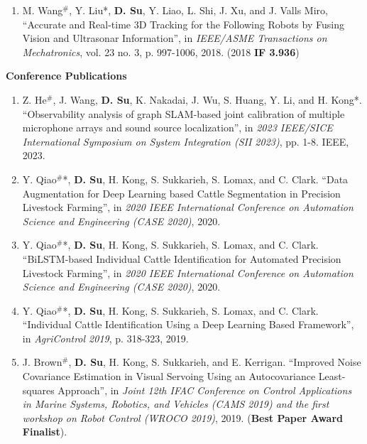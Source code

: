 \documentclass[margin,line]{res}
\begin{document}
\begin{resume}
\begin{enumerate}
\item M. Wang$^{\#}$, Y. Liu*, {\bf D. Su}, Y. Liao, L. Shi, J. Xu, and J. Valls Miro, ``Accurate and Real-time 3D Tracking for the Following Robots by Fusing Vision and Ultrasonar Information'', in {\it IEEE/ASME Transactions on Mechatronics}, vol. 23 no. 3, p. 997-1006, 2018. (2018 \textbf{IF 3.936})
\end{enumerate}

\textbf{Conference Publications}
\begin{enumerate}

\item Z. He$^{\#}$, J. Wang, \textbf{D. Su}, K. Nakadai, J. Wu, S. Huang, Y. Li, and H. Kong*. ``Observability analysis of graph SLAM-based joint calibration of multiple microphone arrays and sound source localization'', in \textit{2023 IEEE/SICE International Symposium on System Integration (SII 2023)}, pp. 1-8. IEEE, 2023.

\item Y. Qiao$^{\#}$*, \textbf{D. Su}, H. Kong, S. Sukkarieh, S. Lomax, and C. Clark. ``Data Augmentation for Deep Learning based Cattle Segmentation in Precision Livestock Farming'', in \textit{2020 IEEE International Conference on Automation Science and Engineering (CASE 2020)}, 2020.

\item Y. Qiao$^{\#}$*, \textbf{D. Su}, H. Kong, S. Sukkarieh, S. Lomax, and C. Clark. ``BiLSTM-based Individual Cattle Identification for Automated Precision Livestock Farming'', in \textit{2020 IEEE International Conference on Automation Science and Engineering (CASE 2020)}, 2020.

\item Y. Qiao$^{\#}$*, \textbf{D. Su}, H. Kong, S. Sukkarieh, S. Lomax, and C. Clark. ``Individual Cattle Identification Using a Deep Learning Based Framework'', in {\it AgriControl 2019}, p. 318-323, 2019.

\item J. Brown$^{\#}$, \textbf{D. Su}, H. Kong, S. Sukkarieh, and E. Kerrigan. ``Improved Noise Covariance Estimation in Visual Servoing Using an Autocovariance Least-squares Approach'', in \textit{Joint 12th IFAC Conference on Control Applications in Marine Systems, Robotics, and Vehicles (CAMS 2019) and the first workshop on Robot Control (WROCO 2019)}, 2019. ({\bf Best Paper Award Finalist}).


\end{enumerate}
\end{resume}
\end{document}
